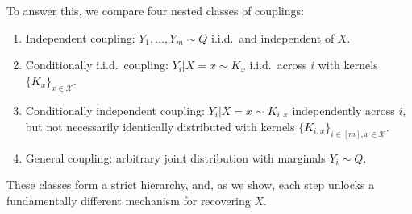 \documentclass[journal]{IEEEtran}
\def\calX{{\mathcal X}}
\newcommand{\1}{\mathbf{1}}
\begin{document}
To answer this, we compare four nested classes of couplings:
\begin{enumerate}
    \item Independent coupling: $Y_1,\dots,Y_m \sim Q$ i.i.d.\ and independent of $X$.
    \item Conditionally i.i.d.\ coupling: $Y_i | X=x \sim K_x$ i.i.d.\ across $i$ with kernels $\{K_x\}_{x\in \calX}$.
    \item Conditionally independent coupling: $Y_i | X=x \sim K_{i,x}$ independently across $i$, but not necessarily identically distributed with kernels $\{K_{i, x}\}_{i\in [m], x\in \calX}$.
    \item General coupling: arbitrary joint distribution with marginals $Y_i\sim Q$.
\end{enumerate}

These classes form a strict hierarchy, and, as we show, each step unlocks a fundamentally different mechanism for recovering $X$.
\end{document}
